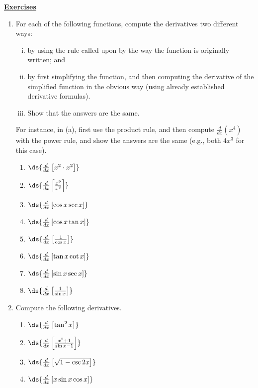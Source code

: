 \begin{center}\underline{\Large{\bf Exercises}}\end{center}
\bigskip
\begin{multicols}{2}
\begin{enumerate}
\item For each of the following functions,
      compute the derivatives two different ways:
      \begin{enumerate}[(i)]
        \item  by using the rule called upon by
               the way the function is originally written; and
        \item  by first simplifying the function, and then
               computing the derivative of the simplified function
               in the obvious way (using already established
               derivative formulas).
        \item Show that the answers are the same.
      \end{enumerate}
      For instance, in (a), first use the product rule, and then
      compute $\frac{d}{dx}(x^4)$ with the power rule, and show the
      answers are the same (e.g., both $4x^3$ for this case).
  \begin{enumerate}
  \item $\ds{\frac{d}{dx}\left[x^2\cdot x^2\right]}$
  \item $\ds{\frac{d}{dx}\left[\frac{x^9}{x^3}\right]}$
  \item $\ds{\frac{d}{dx}\left[\cos x\sec x\right]}$
  \item $\ds{\frac{d}{dx}\left[\cos x\tan x\right]}$
  \item $\ds{\frac{d}{dx}\left[\frac1{\cos x}\right]}$
  \item $\ds{\frac{d}{dx}\left[\tan x\cot x\right]}$
  \item $\ds{\frac{d}{dx}\left[\sin x\sec x\right]}$
  \item $\ds{\frac{d}{dx}\left[\frac{1}{\sin x}\right]}$
  \end{enumerate}
\item Compute the following derivatives.
  \begin{enumerate}
  \item $\ds{\frac{d}{dx}\left[\tan^2x\right]}$
  \item $\ds{\frac{d}{dx}\left[\frac{x^2+1}{\sin x-1}\right]}$
  \item $\ds{\frac{d}{dx}\left[\sqrt{1-\csc 2x}\right]}$
  \item $\ds{\frac{d}{dx}\left[x\sin x\cos x\right]}$

\end{enumerate}
\end{enumerate}
\end{multicols}
